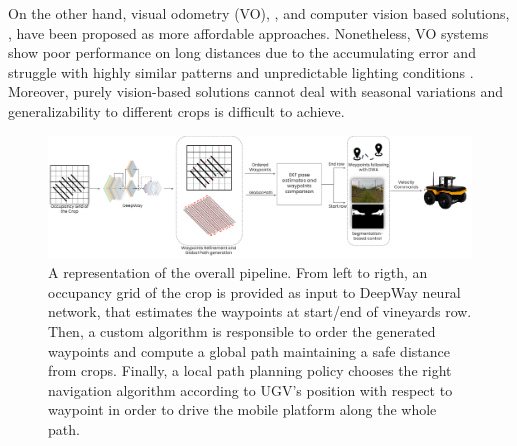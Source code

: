 \documentclass[journal]{IEEEtran}
\begin{document}
On the other hand, visual odometry (VO), \cite{zaman2019cost, nevliudov2021development}, and computer vision based solutions, \cite{auto_nav_for_wolfberry, semantic_seg_synthetic_images}, have been proposed as more affordable approaches. Nonetheless, VO
systems show poor performance on long distances due to the
accumulating error and struggle with highly similar patterns \cite{kim2018low} and unpredictable lighting conditions \cite{anthony2017uav}. Moreover, purely vision-based solutions cannot deal with seasonal variations and generalizability to different crops is difficult to achieve.

\begin{figure}[t]
\centering
\includegraphics[width=\textwidth]{scheme_TMECH.pdf}
\caption{A representation of the overall pipeline. From left to rigth, an occupancy grid of the crop is provided as input to DeepWay neural network, that estimates the waypoints at start/end of vineyards row. Then, a custom algorithm is responsible to order the generated waypoints and compute a global path maintaining a safe distance from crops. Finally, a local path planning policy chooses the right navigation algorithm according to UGV's position with respect to waypoint in order to drive the mobile platform along the whole path.}
\label{fig:tot_system}
\end{figure}
\end{document}
